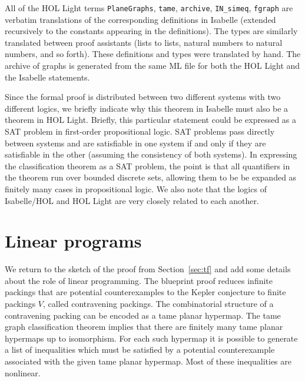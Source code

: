 All of the HOL Light terms
\verb!PlaneGraphs!, \verb!tame!, \verb!archive!, \verb!IN_simeq!,
\verb!fgraph! are verbatim translations of the corresponding
definitions in Isabelle (extended recursively to the constants
appearing in the definitions).  The types are similarly translated
between proof assistants (lists to lists, natural numbers to natural
numbers, and so forth).  These definitions and types were translated
by hand.  The archive of graphs is generated from the same ML file for
both the HOL Light and the Isabelle statements.

Since the formal proof is distributed between two different systems
with two different logics, we briefly indicate why this theorem in
Isabelle must also be a theorem in HOL Light.  Briefly, this
particular statement could be expressed as a SAT problem in
first-order propositional logic.  SAT problems pass directly between
systems and are satisfiable in one system if and only if they are
satisfiable in the other (assuming the consistency of both systems).
In expressing the classification theorem as a SAT problem, the point
is that all quantifiers in the theorem run over bounded discrete sets,
allowing them to be be expanded as finitely many cases in
propositional logic.  We also note that the logics of Isabelle/HOL and
HOL Light are very closely related to each another.

\section{Linear programs}\label{sec:lp}

We return to the sketch of the proof from Section~\ref{sec:tf} and add
some details about the role of linear programming.  The blueprint
proof reduces infinite packings that are potential counterexamples to
the Kepler conjecture to finite packings $V$, called contravening
packings. The combinatorial structure of a contravening packing can be
encoded as a tame planar hypermap. The tame graph classification
theorem implies that there are finitely many tame planar hypermaps up
to isomorphism. For each such hypermap it is possible to generate a
list of inequalities which must be satisfied by a potential
counterexample associated with the given tame planar hypermap. Most of
these inequalities are nonlinear.

